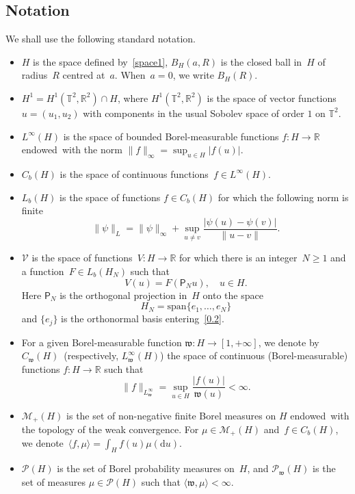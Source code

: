 \documentclass[AHL,Unicode,longabstracts]{cedram}
\newcommand{\R}{{\mathbb R}}
\newcommand{\T}{{\mathbb T}}
\newcommand{\MM}{{\mathcal M}}
\newcommand{\PP}{{\mathcal P}}
\newcommand{\VV}{{\mathcal V}}
\newcommand{\ty}{\infty}
\newcommand{\wwww}{{\mathfrak w}}
\newcommand{\pp}{{{\mathsf P}_N}}
\newcommand{\lag}{\langle}
\newcommand{\rag}{\rangle}
\newcommand{\dd}{\mathrm{d}}
\begin{document}
\subsection*{Notation}

We shall use the following standard notation.
\begin{itemize}
\item
$H$ is the space defined by~\eqref{space1}, $B_H(a,R)$ is the closed ball in~$H$ of radius~$R$ centred at~$a$. When~$a=0$, we write $B_H(R)$.

\item
$H^1= H^1(\T^2, \R^2)\cap H$, where $H^1(\T^2, \R^2)$ is the space of vector functions $u = (u_1,u_2)$ with components in the usual Sobolev space of order $1$ on $\T^2$.

\item
$L^\infty(H)$ is the space of bounded Borel-measurable functions $f:H\to\R$ endowed~with the norm $\|f\|_\infty=\sup_{u\in H}|f(u)|$.

\item
$C_b(H)$ is the space of continuous functions~$f\in L^\infty(H)$.

\item
$L_b(H)$ is the space of functions $f\in C_b(H)$ for which the following norm is finite
\[
\|\psi\|_{L}=\|\psi\|_\infty+\sup_{u\neq v} \frac{ {|\psi(u)-\psi(v)|}}{ \|u-v\| }.
\]

\item
$\VV$ is the space of functions~$V:H\to \R$ for which there is an integer~$N \ge 1$ and a function~$F \in L_b(H_N)$ such that
\begin{equation}\label{repres}
V(u)=F(\pp u),\quad u\in H.
\end{equation}
Here $\pp$ is the orthogonal projection in~$H$ onto the space
\begin{equation}\label{ddftgr}
H_N=\text{span}\{e_1,\ldots, e_N\}
\end{equation}
and $\{e_j\}$ is the orthonormal basis entering~\eqref{0.2}.

\item
For a given Borel-measurable function ${\wwww}:H\to[1,+\infty]$, we denote by $C_\wwww(H)$~(respectively, $L_\wwww^\infty(H)$) the space of continuous (Borel-measurable) functions $f:H\to\R$ such that
\[
\|f\|_{L_\wwww^\infty}=\sup_{u\in H}\frac{|f(u)|}{\wwww(u)}<\ty.
\]

\item
$\MM_+(H)$ is the set of non-negative finite Borel measures on $H$ endowed~with the topology of the weak convergence. For $\mu\in \MM_+(H)$ and~$f\in C_b(H)$, we denote~$\lag f,\mu\rag=\int_Hf(u)\mu(\dd u).$

\item
$\PP(H)$ is the set of Borel probability measures on~$H$, and $\PP_\wwww(H)$ is the set of measures $\mu\in\PP(H)$ such that $\langle \wwww,\mu\rangle<\infty$.
\end{itemize}
\end{document}
